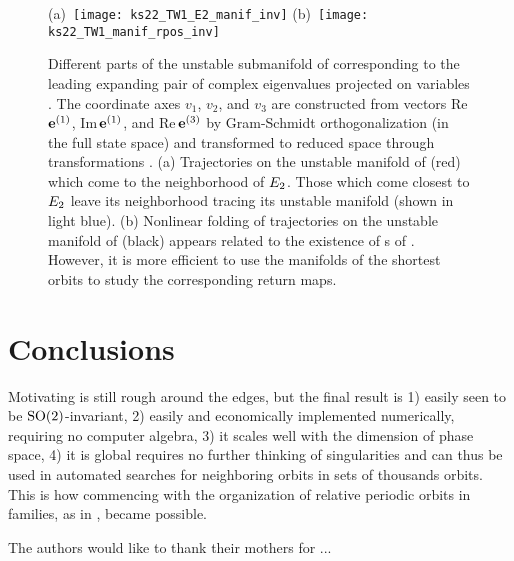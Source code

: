 \documentclass[aip,cha,showpacs,reprint]{revtex4-1} %
\begin{document}
\begin{figure*}[ht]
 \begin{center}
  (a)~\texttt{[image: ks22\_TW1\_E2\_manif\_inv]}
  (b)~\texttt{[image: ks22\_TW1\_manif\_rpos\_inv]}
 \end{center}
\caption{\label{f:ks22_TW1_manifold}
Different parts of the unstable submanifold of 
corresponding to the leading expanding pair of complex eigenvalues
projected on variables . The coordinate axes $v_1$,
$v_2$, and $v_3$ are constructed from vectors Re\,$\jEigvec[1]$,
Im\,$\jEigvec[1]$, and Re\,$\jEigvec[3]$ by Gram-Schmidt orthogonalization
(in the full state space) and transformed to reduced space through
transformations . (a) Trajectories on the unstable
manifold of  (red) which come to the neighborhood of $\EQV{2}$.
Those which come closest to $\EQV{2}$ leave its neighborhood tracing its
unstable manifold (shown in light blue). (b) Nonlinear folding of
trajectories on the unstable manifold of  (black) appears
related to the existence of \rpo s of . However, it is
more efficient to use the manifolds of the shortest orbits to study the
corresponding return maps.
  }
\end{figure*}


\section{Conclusions}

Motivating 
is still rough around the edges, but the final result is
1) easily seen to be $\SOn{2}$-invariant,
2) easily and economically
implemented numerically, requiring no computer algebra, 3) it scales well
with the dimension of phase space, 4) it is global requires no further
thinking of singularities and can thus be used in automated searches for
neighboring orbits in sets of thousands orbits. This is how commencing with the
organization of relative periodic orbits in families, as in ,
became possible.

\begin{acknowledgments}
The authors would like to thank their mothers for ...
\end{acknowledgments}

\appendix
\end{document}
